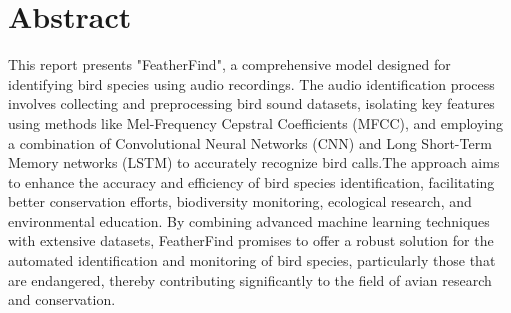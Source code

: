 \chapter*{Abstract}
This report presents "FeatherFind", a comprehensive model designed for
identifying bird species using audio recordings. The audio
identification process involves collecting and preprocessing bird sound
datasets, isolating key features using methods like Mel-Frequency Cepstral
Coefficients (MFCC), and employing a combination of Convolutional Neural
Networks (CNN) and Long Short-Term Memory networks (LSTM) to accurately
recognize bird calls.The approach aims to enhance the accuracy and
efficiency of bird species identification, facilitating better conservation
efforts, biodiversity monitoring, ecological research, and environmental
education. By combining advanced machine learning techniques with extensive
datasets, FeatherFind promises to offer a robust solution for the automated identification
and monitoring of bird species, particularly those that are endangered, thereby
contributing significantly to the field of avian research and conservation.


    {

        \KECadjusttocspacings %
        \makeatletter
        \def\@makeschapterhead#1{%
            {\newpage \parindent \z@ \raggedright \normalfont
                    \interlinepenalty\@M
                    \center\fontsize{16pt}{1} \bfseries
                    \MakeUppercase{#1}\par\nobreak
                    \vskip 18\p@ %
                }}
        \makeatother

        \tableofcontents %
        \listoffigures %
    }

